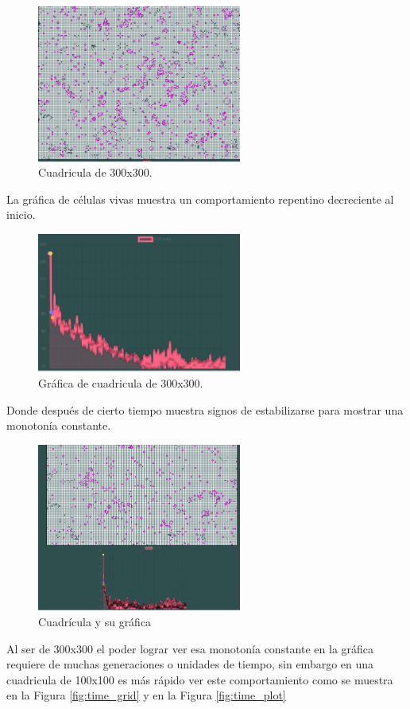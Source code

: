 \begin{figure}[h]
	\centering
	\includegraphics[width=0.6\textwidth]{capitulo2/images/300grid.png}
	\caption{Cuadricula de 300x300.}
	\label{fig:grid300}
\end{figure}
\newpage
La gráfica de células vivas muestra un comportamiento repentino decreciente al inicio.
\begin{figure}[h]
	\centering
	\includegraphics[width=0.6\textwidth]{capitulo2/images/300plot.png}
	\caption{Gráfica de cuadricula de 300x300.}
	\label{fig:plot300}
\end{figure}
\newpage
Donde después de cierto tiempo muestra signos de estabilizarse para mostrar una monotonía constante.

\begin{figure}[h]
	\centering
	\includegraphics[width=0.6\textwidth]{capitulo2/images/300plotgrid2.png}
	\caption{Cuadrícula y su gráfica}
	\label{fig:grid300_2}
\end{figure}
\newpage
Al ser de 300x300 el poder lograr ver esa monotonía constante en la gráfica requiere de muchas generaciones o unidades de tiempo, sin embargo en una cuadricula de 100x100 es más rápido ver este comportamiento como se muestra en la Figura \ref{fig:time_grid} y en la Figura \ref{fig:time_plot}

